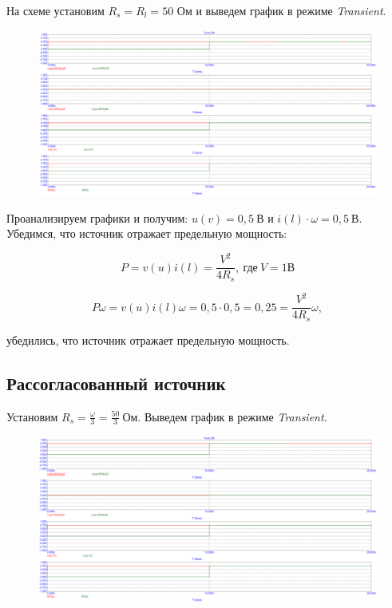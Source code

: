 \documentclass[a4paper, 12pt]{article}%
\begin{document}
На схеме установим $R_s = R_l = 50$ Ом и выведем график в режиме \textit{Transient}.

\begin{figure}[h!]
\centering
\includegraphics[scale=0.4]{images/Graph1.png}
\label{fig:Image1}
\end{figure}

Проанализируем графики и получим: $u(v) = 0,5 \: \textit{В}$ и $i(l)\cdot \omega = 0,5 \: \textit{В}$. Убедимся, что источник отражает предельную мощность:

\[P = v(u)i(l) = \frac{V^2}{4R_s}, \: \text{где} \: V = 1\textit{В}\]

\[P\omega = v(u)i(l)\omega = 0,5\cdot 0,5 = 0,25 = \frac{V^2}{4R_s} \omega,\]

убедились, что источник отражает предельную мощность.

\subsection*{Рассогласованный источник}

Установим $R_s = \frac{\omega}{3} = \frac{50}{3} \: \textit{Ом}$. Выведем график в режиме \textit{Transient}.

\begin{figure}[h!]
\centering
\includegraphics[scale=0.4]{images/Graph2.png}
\label{fig:Image1}
\end{figure}
\end{document}
